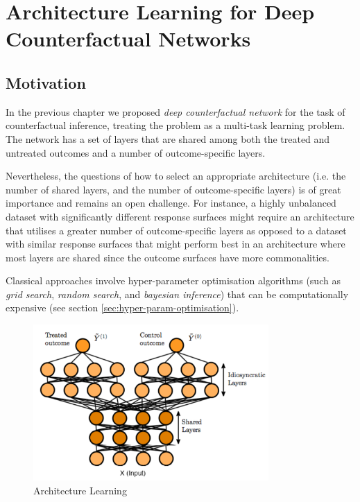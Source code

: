 %

\chapter{\label{ch:4-DCN-LAs}Architecture Learning for Deep Counterfactual Networks} 


\section{Motivation}

In the previous chapter we proposed \emph{deep counterfactual network} for the task of counterfactual inference, treating the problem as a multi-task learning problem. The network has a set of layers that are shared among both the treated and untreated outcomes and a number of outcome-specific layers. 

Nevertheless, the questions of how to select an appropriate architecture (i.e. the number of shared layers, and the number of outcome-specific layers) is of great importance and remains an open challenge. For instance, a highly unbalanced dataset with significantly different response surfaces might require an architecture that utilises a greater number of outcome-specific layers as opposed to a dataset with similar response surfaces that might perform best in an architecture where most layers are shared since the outcome surfaces have more commonalities. 

Classical approaches involve hyper-parameter optimisation algorithms (such as \emph{grid search}, \emph{random search}, and \emph{bayesian inference}) that can be computationally expensive (see section \ref{sec:hyper-param-optimisation}). 

\begin{figure}[h]
	\centering
	\includegraphics[width=0.8\textwidth]{figures/chapter-4/architecture-learning-motivation.png}
	\caption{Architecture Learning}\label{fig:architecture-learning-motivation}
\end{figure}

